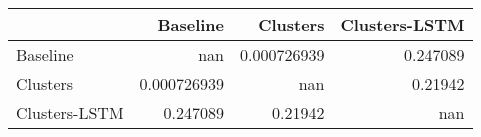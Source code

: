 \begin{tabular}{lrrr}
\toprule
               &      Baseline &      Clusters &   Clusters-LSTM \\
\midrule
 Baseline      & nan           &   0.000726939 &        0.247089 \\
 Clusters      &   0.000726939 & nan           &        0.21942  \\
 Clusters-LSTM &   0.247089    &   0.21942     &      nan        \\
\bottomrule
\end{tabular}